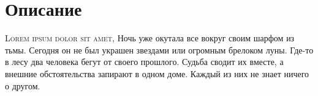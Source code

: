\chapter{Описание}
\lettrine{L}{orem ipsum dolor sit amet}, Ночь уже окутала все вокруг своим шарфом из тьмы. Сегодня он не был украшен звездами или огромным брелоком луны. Где-то в лесу два человека бегут от своего прошлого. Судьба сводит их вместе, а внешние обстоятельства запирают в одном доме. Каждый из них не знает ничего о другом.

\cleardoublepage   %